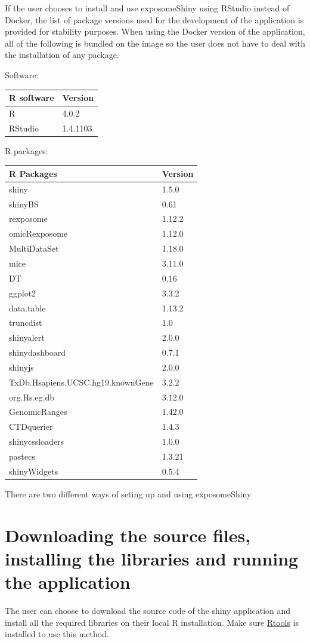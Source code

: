 \documentclass[
]{book}
\begin{document}
If the user chooses to install and use exposomeShiny using RStudio instead of Docker, the list of package versions used for the development of the application is provided for stability purposes. When using the Docker version of the application, all of the following is bundled on the image so the user does not have to deal with the installation of any package.

Software:

\begin{longtable}[]{@{}ll@{}}
\toprule
R software & Version\tabularnewline
\midrule
\endhead
R & 4.0.2\tabularnewline
RStudio & 1.4.1103\tabularnewline
\bottomrule
\end{longtable}

R packages:

\begin{longtable}[]{@{}ll@{}}
\toprule
R Packages & Version\tabularnewline
\midrule
\endhead
shiny & 1.5.0\tabularnewline
shinyBS & 0.61\tabularnewline
rexposome & 1.12.2\tabularnewline
omicRexposome & 1.12.0\tabularnewline
MultiDataSet & 1.18.0\tabularnewline
mice & 3.11.0\tabularnewline
DT & 0.16\tabularnewline
ggplot2 & 3.3.2\tabularnewline
data.table & 1.13.2\tabularnewline
truncdist & 1.0\tabularnewline
shinyalert & 2.0.0\tabularnewline
shinydashboard & 0.7.1\tabularnewline
shinyjs & 2.0.0\tabularnewline
TxDb.Hsapiens.UCSC.hg19.knownGene & 3.2.2\tabularnewline
org.Hs.eg.db & 3.12.0\tabularnewline
GenomicRanges & 1.42.0\tabularnewline
CTDquerier & 1.4.3\tabularnewline
shinycssloaders & 1.0.0\tabularnewline
pastecs & 1.3.21\tabularnewline
shinyWidgets & 0.5.4\tabularnewline
\bottomrule
\end{longtable}

There are two different ways of seting up and using exposomeShiny

\hypertarget{downloading-the-source-files-installing-the-libraries-and-running-the-application}{%
\section{Downloading the source files, installing the libraries and running the application}\label{downloading-the-source-files-installing-the-libraries-and-running-the-application}}

The user can choose to download the source code of the shiny application and install all the required libraries on their local R installation. Make sure \href{https://cran.r-project.org/bin/windows/Rtools/history.html}{Rtools} is installed to use this method.
\end{document}
